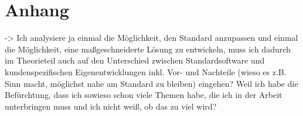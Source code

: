 \chapter{Anhang}

-> Ich analysiere ja einmal die Möglichkeit, den Standard anzupassen und einmal die Möglichkeit, eine ma\ss geschneiderte Lösung zu entwickeln, muss ich dadurch im Theorieteil auch auf den Unterschied zwischen Standardsoftware und kundenspezifischen Eigenentwicklungen inkl. Vor- und Nachteile (wieso es z.B. Sinn macht, möglichst nahe am Standard zu bleiben) eingehen? Weil ich habe die Befürchtung, dass ich sowieso schon viele Themen habe, die ich in der Arbeit unterbringen muss und ich nicht wei\ss, ob das zu viel wird?